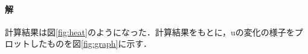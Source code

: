 \documentclass[platex,dvipdfmx,]{jarticle}
\begin{document}
\paragraph*{解}計算結果は図\ref{fig:heat}のようになった．計算結果をもとに，uの変化の様子をプロットしたものを図\ref{fig:graph}に示す．
\end{document}
